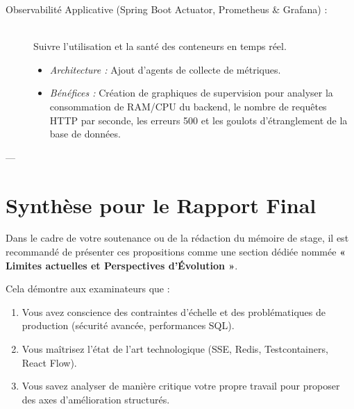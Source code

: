 \documentclass[12pt,a4paper]{article}
\begin{document}
\begin{description}
    \item[Observabilité Applicative (Spring Boot Actuator, Prometheus \& Grafana) :] \hfill \\
    Suivre l'utilisation et la santé des conteneurs en temps réel.
    \begin{itemize}
        \item \textit{Architecture :} Ajout d'agents de collecte de métriques.
        \item \textit{Bénéfices :} Création de graphiques de supervision pour analyser la consommation de RAM/CPU du backend, le nombre de requêtes HTTP par seconde, les erreurs 500 et les goulots d'étranglement de la base de données.
    \end{itemize}
\end{description}

---

\section{Synthèse pour le Rapport Final}
Dans le cadre de votre soutenance ou de la rédaction du mémoire de stage, il est recommandé de présenter ces propositions comme une section dédiée nommée \textbf{« Limites actuelles et Perspectives d'Évolution »}. 

Cela démontre aux examinateurs que :
\begin{enumerate}
    \item Vous avez conscience des contraintes d'échelle et des problématiques de production (sécurité avancée, performances SQL).
    \item Vous maîtrisez l'état de l'art technologique (SSE, Redis, Testcontainers, React Flow).
    \item Vous savez analyser de manière critique votre propre travail pour proposer des axes d'amélioration structurés.
\end{enumerate}
\end{document}
